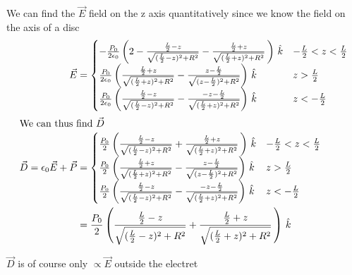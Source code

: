 \documentclass[../main.tex]{subfiles}
\begin{document}
\begin{questions}
\begin{solution}
	We can find the $\vec{E}$ field on the z axis quantitatively since we know the field on the axis of a disc
	\begin{align}
		\vec{E} &= 
		\begin{cases}
			-\frac{P_0}{2\epsilon_0}\left(2-\frac{\frac{L}{2}-z}{\sqrt{(\frac{L}{2}-z)^2+R^2}}-\frac{\frac{L}{2}+z}{\sqrt{(\frac{L}{2}+z)^2+R^2}}\,\right)\,\hat{k} & -\frac{L}{2} < z < \frac{L}{2}\\
			\frac{P_0}{2\epsilon_0}\left(\frac{\frac{L}{2}+z}{\sqrt{(\frac{L}{2}+z)^2+R^2}}-\frac{z-\frac{L}{2}}{\sqrt{(z-\frac{L}{2})^2+R^2}}\right)\,\hat{k} & z > \frac{L}{2}\\
			\frac{P_0}{2\epsilon_0}\left(\frac{\frac{L}{2}-z}{\sqrt{(\frac{L}{2}-z)^2+R^2}}-\frac{-z-\frac{L}{2}}{\sqrt{(\frac{L}{2}+z)^2+R^2}}\right)\,\hat{k} & z < -\frac{L}{2}
		\end{cases}\\
		\intertext{We can thus find $\vec{D}$}
		\vec{D} = \epsilon_0\vec{E} + \vec{P} &= 
		\begin{cases}
			\frac{P_0}{2}\left(\frac{\frac{L}{2}-z}{\sqrt{(\frac{L}{2}-z)^2+R^2}}+\frac{\frac{L}{2}+z}{\sqrt{(\frac{L}{2}+z)^2+R^2}}\,\right)\,\hat{k} & -\frac{L}{2} < z < \frac{L}{2}\\
			\frac{P_0}{2}\left(\frac{\frac{L}{2}+z}{\sqrt{(\frac{L}{2}+z)^2+R^2}}-\frac{z-\frac{L}{2}}{\sqrt{(z-\frac{L}{2})^2+R^2}}\right)\,\hat{k} & z > \frac{L}{2}\\
			\frac{P_0}{2}\left(\frac{\frac{L}{2}-z}{\sqrt{(\frac{L}{2}-z)^2+R^2}}-\frac{-z-\frac{L}{2}}{\sqrt{(\frac{L}{2}+z)^2+R^2}}\right)\,\hat{k} & z < -\frac{L}{2}
		\end{cases}\\
		&=\frac{P_0}{2}\left(\frac{\frac{L}{2}-z}{\sqrt{(\frac{L}{2}-z)^2+R^2}}+\frac{\frac{L}{2}+z}{\sqrt{(\frac{L}{2}+z)^2+R^2}}\,\right)\,\hat{k}
	\end{align}

	$\vec{D}$ is of course only $\propto\vec{E}$ outside the electret

	\begin{figure}[H]
		\centering

\end{figure}
\end{solution}
\end{questions}
\end{document}
